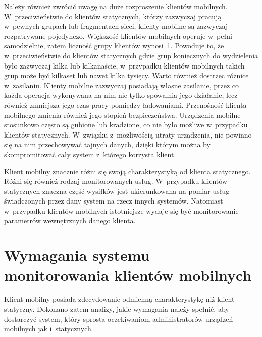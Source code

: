 Należy również zwrócić uwagę na duże rozproszenie klientów
mobilnych. W~przeciwieństwie do klientów statycznych, którzy zazwyczaj
pracują w~pewnych grupach lub fragmentach sieci, klienty mobilne są
zazwyczaj rozpatrywane pojedynczo. Większość klientów mobilnych
operuje w~pełni samodzielnie, zatem liczność grupy klientów
wynosi~1. Powoduje to, że w~przeciwieństwie do klientów statycznych
gdzie grup koniecznych do wydzielenia było zazwyczaj kilka lub
kilkanaście, w~przypadku klientów mobilnych takich grup może być
kilkaset lub nawet kilka tysięcy. Warto również dostrzec różnice
w~zasilaniu. Klienty mobilne zazwyczaj posiadają własne zasilanie,
przez co każda operacja wykonywana na nim nie tylko spowalnia jego
działanie, lecz również zmniejsza jego czas pracy pomiędzy
ładowaniami. Przenośność klienta mobilnego zmienia również jego
stopień bezpieczeństwa. Urządzenia mobilne stosunkowo często są
gubione lub kradzione, co nie było możliwe w~przypadku klientów
statycznych. W~związku z~możliwością utraty urządzenia, nie powinno
się na nim przechowywać tajnych danych, dzięki którym można by
skompromitować cały system z~którego korzysta klient.

Klient mobilny znacznie różni się swoją charakterystyką od klienta
statycznego. Różni się również rodzaj monitorowanych
usług. W~przypadku klientów statycznych znaczna część wysiłków jest
ukierunkowana na pomiar usług świadczonych przez dany system na rzecz
innych systemów. Natomiast w~przypadku klientów mobilnych istotniejsze
wydaje się być monitorowanie parametrów wewnętrznych danego klienta.

\section[Wymagania][Wymagania systemu monitorowania klientów
mobilnych]{Wymagania systemu monitorowania klientów mobilnych}

Klient mobilny posiada zdecydowanie odmienną charakterystykę niż
klient statyczny. Dokonano zatem analizy, jakie wymagania należy
spełnić, aby dostarczyć system, który sprosta oczekiwaniom
administratorów urządzeń mobilnych jak i~statycznych.

